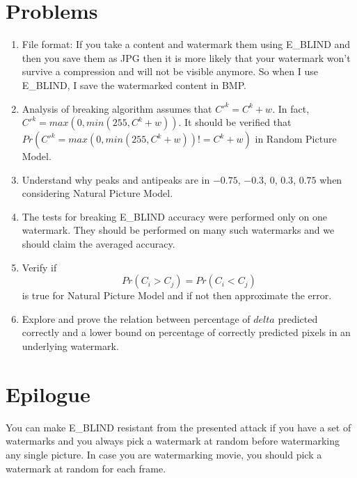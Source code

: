 \documentclass[a4paper,12pt]{article}
\begin{document}
\section{Problems}
\begin{enumerate}
    \item File format: If you take a content and watermark them using E\_BLIND
    and then you save them as JPG then it is more likely that your watermark
    won't survive a compression and will not be visible anymore. So when I use
    E\_BLIND, I save the watermarked content in BMP.
    \item Analysis of breaking algorithm assumes that $C'^k = C^k + w$. In fact,
    $C'^k = max(0, min(255, C^k + w))$. It should be verified that
    $Pr(C'^k = max(0, min(255, C^k + w)) != C^k + w)$ in Random Picture Model.
    \item Understand why peaks and antipeaks are in $-0.75$, $-0.3$, $0$, $0.3$, $0.75$
    when considering Natural Picture Model.
    \item The tests for breaking E\_BLIND accuracy were performed only on one
    watermark. They should be performed on many such watermarks and we should
    claim the averaged accuracy.
    \item Verify if $$Pr(C_i > C_j) = Pr(C_i < C_j)$$ is true for Natural Picture
    Model and if not then approximate the error.
    \item Explore and prove the relation between percentage of $delta$ predicted
        correctly and a lower bound on percentage of correctly predicted pixels
        in an underlying watermark.
        
        
\end{enumerate}
\section{Epilogue}
You can make E\_BLIND resistant from the presented attack if you have a set of
watermarks and you always pick a watermark at random before watermarking any
single picture. In case you are watermarking movie, you should pick a watermark
at random for each frame.


{}


\newpage
\end{document}

